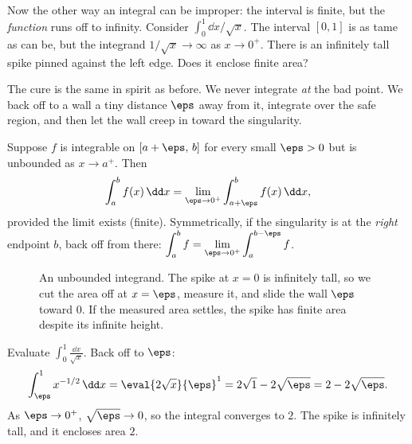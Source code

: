Now the other way an integral can be improper: the interval is finite, but the
\emph{function} runs off to infinity. Consider $\int_0^1 \dd x/\sqrt{x}$. The
interval $[0,1]$ is as tame as can be, but the integrand $1/\sqrt{x}\to\infty$ as
$x\to 0^+$. There is an infinitely tall spike pinned against the left edge. Does
it enclose finite area?

The cure is the same in spirit as before. We never integrate \emph{at} the bad
point. We back off to a wall a tiny distance $\eps$ away from it, integrate over
the safe region, and then let the wall creep in toward the singularity.

\begin{definition}
\label{ch25:def-second-kind}
Suppose $f$ is integrable on $[a+\eps,\,b]$ for every small $\eps>0$ but is
unbounded as $x\to a^+$. Then
\[
  \int_a^{b} f(x)\,\dd x
  = \lim_{\eps\to 0^+}\int_{a+\eps}^{b} f(x)\,\dd x,
\]
provided the limit exists (finite). Symmetrically, if the singularity is at the
\emph{right} endpoint $b$, back off from there:
$\displaystyle \int_a^{b} f = \lim_{\eps\to 0^+}\int_a^{b-\eps} f$.
\end{definition}

\begin{figure}[H]
\centering
{}
\caption{An unbounded integrand. The spike at $x=0$ is infinitely tall, so we cut
the area off at $x=\eps$, measure it, and slide the wall $\eps$ toward $0$. If the
measured area settles, the spike has finite area despite its infinite height.}
\label{ch25:fig-spike}
\end{figure}

\begin{example}
\label{ch25:ex-sqrt}
Evaluate $\displaystyle\int_0^{1}\frac{\dd x}{\sqrt{x}}$. Back off to $\eps$:
\[
  \int_{\eps}^{1} x^{-1/2}\,\dd x
  = \eval{2\sqrt{x}}{\eps}^{1}
  = 2\sqrt{1} - 2\sqrt{\eps}
  = 2 - 2\sqrt{\eps}.
\]
As $\eps\to 0^+$, $\sqrt{\eps}\to 0$, so the integral converges to $2$. The spike is
infinitely tall, and it encloses area $2$.
\end{example}

